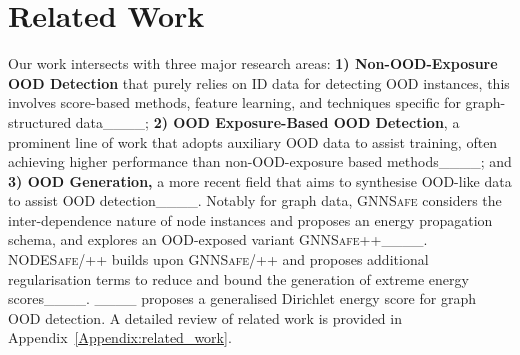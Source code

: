 \section{Related Work}
Our work intersects with three major research areas: \textbf{1) Non-OOD-Exposure OOD Detection} that purely relies on ID data for detecting OOD instances, this involves score-based methods, feature learning, and techniques specific for graph-structured data____; \textbf{2) OOD Exposure-Based OOD Detection}, a prominent line of work that adopts auxiliary OOD data to assist training, often achieving higher performance than non-OOD-exposure based methods____; and \textbf{3) OOD Generation,} a more recent field that aims to synthesise OOD-like data to assist OOD detection____. Notably for graph data, \textsc{GNNSafe} considers the inter-dependence nature of node instances and proposes an energy propagation schema, and explores an OOD-exposed variant \textsc{GNNSafe++}____. \textsc{NODESafe/++} builds upon \textsc{GNNSafe/++} and proposes additional regularisation terms to reduce and bound the generation of extreme energy scores____. ____ proposes a generalised Dirichlet energy score for graph OOD detection. A detailed review of related work is provided in Appendix~\ref{Appendix:related_work}.


